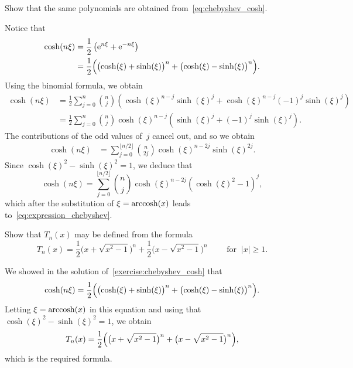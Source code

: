 \begin{exercise}
    \label{exercise:chebyshev_cosh}
    Show that the same polynomials are obtained from~\eqref{eq:chebyshev_cosh}.
\end{exercise}
\begin{solution}
    Notice that
    \begin{align*}
        \cosh(n \xi)
        &= \frac{1}{2} \left( \mathrm e^{n \xi} + \mathrm e^{-n \xi} \right) \\
        &= \frac{1}{2} \Bigl( \bigl(\cosh (\xi) + \sinh(\xi)\bigr)^n  + \bigl(\cosh(\xi) - \sinh(\xi)\bigr)^n \Bigr).
    \end{align*}
    Using the binomial formula, we obtain
    \begin{align*}
        \cosh(n \xi)
        &= \frac{1}{2}  \sum_{j=0}^{n} \binom{n}{j} \left( \cosh(\xi)^{n-j} \sinh(\xi)^j + \cosh(\xi)^{n-j} (-1)^j \sinh(\xi)^j \right) \\
        &=  \frac{1}{2} \sum_{j=0}^{n} \binom{n}{j} \cosh(\xi)^{n-j} \left( \sinh(\xi)^j + (-1)^j \sinh(\xi)^j \right).
    \end{align*}
    The contributions of the odd values of~$j$ cancel out,
    and so we obtain
    \begin{align*}
        \cosh(n \xi)
        &=  \sum_{j=0}^{\lfloor n / 2 \rfloor} \binom{n}{2j} \cosh(\xi)^{n-2j} \sinh(\xi)^{2j}.
    \end{align*}
    Since $\cosh(\xi)^2 - \sinh(\xi)^2 = 1$,
    we deduce that
    \[
        \cosh(n \xi)
        =  \sum_{j=0}^{\lfloor n / 2 \rfloor} \binom{n}{j} \cosh(\xi)^{n-2j} (\cosh(\xi)^2 - 1)^{j},
    \]
    which after the substitution of $\xi = \operatorname{arccosh}(x)$ leads to~\eqref{eq:expression_chebyshev}.
\end{solution}

\begin{exercise}
    \label{exercise:yet_another_expression_cheby}
    Show that $T_n(x)$ may be defined from the formula
    \begin{equation}
        \label{eq:chebyshev_polynomials}
        T_n(x) =
            \frac{1}{2} \Big(x+\sqrt{x^2-1} \Big)^n + \frac{1}{2} \Big(x-\sqrt{x^2-1} \Big)^n \qquad \text{ for }~ |x| \ge 1.
    \end{equation}
\end{exercise}
\begin{solution}
    We showed in the solution of~\cref{exercise:chebyshev_cosh} that
    \[
        \cosh(n \xi)= \frac{1}{2} \Bigl( \bigl(\cosh (\xi) + \sinh(\xi)\bigr)^n  + \bigl(\cosh(\xi) - \sinh(\xi)\bigr)^n \Bigr).
    \]
    Letting $\xi = \operatorname{arccosh}(x)$ in this equation and using that $\cosh(\xi)^2 - \sinh(\xi)^2 = 1$,
    we obtain
    \[
        T_n(x) = \frac{1}{2} \Bigl( \bigl(x + \sqrt{x^2 - 1} \bigr)^n  + \bigl(x - \sqrt{x^2 - 1}\bigr)^n \Bigr),
    \]
    which is the required formula.
\end{solution}


